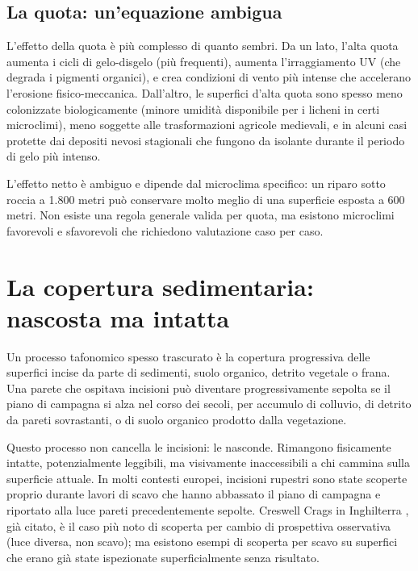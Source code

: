 \subsection{La quota: un'equazione ambigua}

L'effetto della quota è più complesso di quanto sembri. Da un lato, l'alta quota aumenta i cicli di gelo-disgelo (più frequenti), aumenta l'irraggiamento UV (che degrada i pigmenti organici), e crea condizioni di vento più intense che accelerano l'erosione fisico-meccanica. Dall'altro, le superfici d'alta quota sono spesso meno colonizzate biologicamente (minore umidità disponibile per i licheni in certi microclimi), meno soggette alle trasformazioni agricole medievali, e in alcuni casi protette dai depositi nevosi stagionali che fungono da isolante durante il periodo di gelo più intenso.

L'effetto netto è ambiguo e dipende dal microclima specifico: un riparo sotto roccia a 1.800 metri può conservare molto meglio di una superficie esposta a 600 metri. Non esiste una regola generale valida per quota, ma esistono microclimi favorevoli e sfavorevoli che richiedono valutazione caso per caso.

\section{La copertura sedimentaria: nascosta ma intatta}

Un processo tafonomico spesso trascurato è la copertura progressiva delle superfici incise da parte di sedimenti, suolo organico, detrito vegetale o frana. Una parete che ospitava incisioni può diventare progressivamente sepolta se il piano di campagna si alza nel corso dei secoli, per accumulo di colluvio, di detrito da pareti sovrastanti, o di suolo organico prodotto dalla vegetazione.

Questo processo non cancella le incisioni: le nasconde. Rimangono fisicamente intatte, potenzialmente leggibili, ma visivamente inaccessibili a chi cammina sulla superficie attuale. In molti contesti europei, incisioni rupestri sono state scoperte proprio durante lavori di scavo che hanno abbassato il piano di campagna e riportato alla luce pareti precedentemente sepolte. Creswell Crags in Inghilterra \citep{pettitt2007}, già citato, è il caso più noto di scoperta per cambio di prospettiva osservativa (luce diversa, non scavo); ma esistono esempi di scoperta per scavo su superfici che erano già state ispezionate superficialmente senza risultato.

